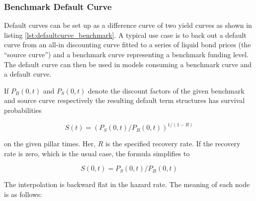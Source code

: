 \subsubsection{Benchmark Default Curve}\label{ss:benchmark_default_curve}

Default curves can be set up as a difference curve of two yield curves as shown in listing
\ref{lst:defaultcurve_benchmark}. A typical use case is to back out a default curve from an all-in discounting curve
fitted to a series of liquid bond prices (the ``source curve'') and a benchmark curve representing a benchmark funding
level. The default curve can then be used in models consuming a benchmark curve and a default curve.

If $P_B(0,t)$ and $P_S(0,t)$ denote the discount factors of the given benchmark
and source curve respectively the resulting default term structures has survival probabilities

\begin{equation}
S(t) = \left( P_S(0,t) / P_B(0,t) \right) ^ { 1/(1-R) }
\end{equation}

on the given pillar times. Her, $R$ is the specified recovery rate. If the recovery rate is zero, which is the usual
case, the formula simplifies to

\begin{equation}
  S(0,t) = P_S(0,t) / P_B(0,t)
\end{equation}

The interpolation is backward flat in the hazard rate. The meaning of each node is as follows:

